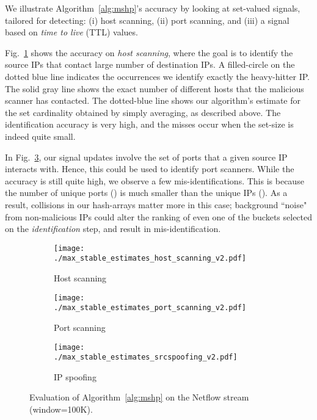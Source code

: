 \documentclass[10pt, conference, letterpaper,onecolumn]{IEEEtranv1.8}
\theoremstyle{plain}\newtheorem{thm}{Theorem}\newtheorem{lem}{Lemma}
\theoremstyle{definition}
\begin{document}
\smallskip
{}
We illustrate Algorithm~\ref{alg:mshp}'s accuracy by looking at set-valued signals, tailored for detecting: 
(i) host scanning, (ii) port scanning, and (iii) a signal based on \emph{time to live} (TTL) values. 


Fig.~\ref{fig:max_sketch_eval} shows the accuracy on {\em host scanning}, 
where the goal is to identify the source IPs that contact large number of destination IPs.  
A filled-circle on the dotted blue line indicates the occurrences we identify 
exactly the heavy-hitter IP. The solid gray line shows the exact number of different hosts that the malicious scanner has contacted. The dotted-blue
line shows our algorithm's estimate for the set cardinality obtained by simply averaging, as described above.
The identification accuracy
is very high, and the misses occur when the set-size is indeed quite small. 

In Fig.~\ref{fig:max_sketch_eval_ports}, our signal updates involve the set of ports that a given source IP interacts with.
Hence, this could be used to identify port scanners. While the accuracy is still quite high,
we observe a few mis-identifications. This is because the number of unique ports () is much smaller than the unique IPs ().
As a result, collisions in our hash-arrays matter more in this case; background ``noise" from
non-malicious IPs could alter the ranking of even one of the buckets selected on the \emph{identification} step, and result in mis-identification.

\begin{figure*}[t]
        \centering
        \begin{subfigure}[b]{0.3\textwidth}
              \texttt{[image: ./max\_stable\_estimates\_host\_scanning\_v2.pdf]}
                \caption{\footnotesize Host scanning}
                \label{fig:max_sketch_eval}
        \end{subfigure}
        \begin{subfigure}[b]{0.3\textwidth}
                \texttt{[image: ./max\_stable\_estimates\_port\_scanning\_v2.pdf]}
                \caption{\footnotesize Port scanning}
                \label{fig:max_sketch_eval_ports}
        \end{subfigure}                
        \begin{subfigure}[b]{0.3\textwidth}
                \texttt{[image: ./max\_stable\_estimates\_srcspoofing\_v2.pdf]}
                \caption{\footnotesize IP spoofing}
                \label{fig:max_sketch_eval_ports}
        \end{subfigure}
         \caption{\footnotesize Evaluation of Algorithm~\ref{alg:mshp} on the Netflow stream (window=100K).}
          \label{fig:max_stable_case_studies}
\end{figure*}
\end{document}
